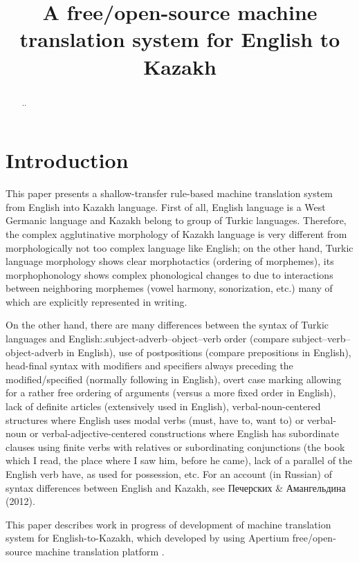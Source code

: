 \documentclass[11pt]{article}
\title{A free/open-source machine translation system for English to Kazakh}
\date{}
\begin{document}
\maketitle 

\begin{abstract}
..
\end{abstract}

\section{Introduction}

This paper presents a shallow-transfer rule-based machine translation system from English into Kazakh language. First of all, English language is a West Germanic language and Kazakh belong to group of Turkic languages. Therefore, the complex agglutinative morphology of Kazakh language is very different from morphologically not too complex language like English; on the other hand, Turkic language morphology shows clear morphotactics (ordering of morphemes), its morphophonology shows complex phonological changes to due to interactions between neighboring morphemes (vowel harmony, sonorization, etc.) many of which are explicitly represented in writing.

On the other hand, there are many differences between the syntax of Turkic languages and English:.subject-adverb–object–verb order (compare subject–verb–object-adverb in English), use of postpositions (compare prepositions in English), head-final syntax with modifiers and specifiers always preceding the modified/specified (normally following in English), overt case marking allowing for a rather free ordering of arguments (versus a more fixed order in English), lack of definite articles (extensively used in English), verbal-noun-centered structures where English uses modal verbs (must, have to, want to) or verbal-noun or verbal-adjective-centered constructions where English has subordinate clauses using finite verbs with relatives or subordinating conjunctions (the book which I read, the place where I saw him, before he came), lack of a parallel of the English verb have, as used for possession, etc. For an account (in Russian) of syntax differences between English and Kazakh, see Печерских \& Амангельдина (2012).

This paper describes work in progress of development of machine translation system for English-to-Kazakh, which developed by using Apertium free/open-source machine translation platform \citep{forcada11}. %
\end{document}
